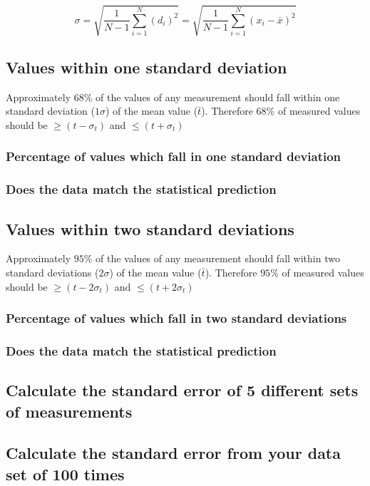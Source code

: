 \documentclass[11pt, letterpaper, includehead]{article}
\begin{document}
  $$\sigma = \sqrt{\frac{1}{N - 1}\sum_{i = 1}^{N} (d_i)^2} = \sqrt{\frac{1}{N - 1}\sum_{i = 1}^{N} (x_i - \bar{x})^2}$$

  \subsection{Values within one standard deviation} %
  Approximately $68\%$ of the values of any measurement should fall within one 
  standard deviation ($1 \sigma$) of the mean value ($\bar{t}$). Therefore $68\%$ of measured 
  values should be $\geq (t - \sigma_t)$ and $\leq (t + \sigma_t)$

  \subsubsection{Percentage of values which fall in one standard deviation}

  \subsubsection{Does the data match the statistical prediction}

  \subsection{Values within two standard deviations} %
  Approximately $95\%$ of the values of any measurement should fall within two 
  standard deviations ($2 \sigma$) of the mean value ($\bar{t}$). Therefore $95\%$ of measured 
  values should be $\geq (t - 2 \sigma_t)$ and $\leq (t + 2 \sigma_t)$

  \subsubsection{Percentage of values which fall in two standard deviations}

  \subsubsection{Does the data match the statistical prediction}

  \subsection{Calculate the standard error of 5 different sets of measurements}

  \subsection{Calculate the standard error from your data set of 100 times}
  
\end{document}
